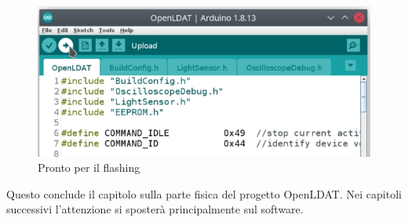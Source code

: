 \begin{figure}[H]
	\centering
	\includegraphics[width=\textwidth]{Dispositivo_files/flashing_05.png}
	\caption{Pronto per il flashing}
	\label{fig:flashing_05}
\end{figure}

Questo conclude il capitolo sulla parte fisica del progetto OpenLDAT. Nei capitoli successivi l'attenzione si sposterà principalmente sul software. %
